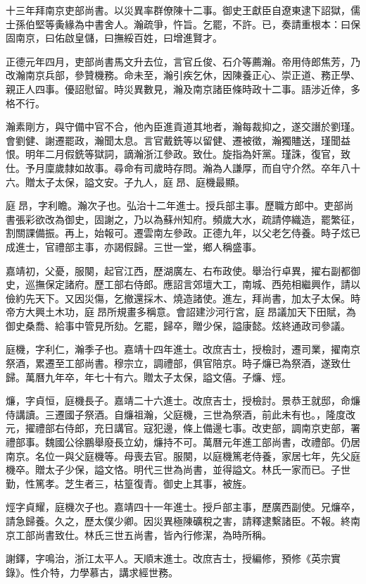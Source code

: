 \begin{pinyinscope}
十三年拜南京吏部尚書。以災異率群僚陳十二事。御史王獻臣自遼東逮下詔獄，儒士孫伯堅等夤緣為中書舍人。瀚疏爭，忤旨。乞罷，不許。已，奏請重根本：曰保固南京，曰佑啟皇儲，曰撫綏百姓，曰增進賢才。

正德元年四月，吏部尚書馬文升去位，言官丘俊、石介等薦瀚。帝用侍郎焦芳，乃改瀚南京兵部，參贊機務。命未至，瀚引疾乞休，因陳養正心、崇正道、務正學、親正人四事。優詔慰留。時災異數見，瀚及南京諸臣條時政十二事。語涉近倖，多格不行。

瀚素剛方，與守備中官不合，他內臣進貢道其地者，瀚每裁抑之，遂交譖於劉瑾。會劉健、謝遷罷政，瀚聞太息。言官戴銑等以留健、遷被徵，瀚獨贐送，瑾聞益恨。明年二月假銑等獄詞，謫瀚浙江參政。致仕。旋指為奸黨。瑾誅，復官，致仕。予月廩歲隸如故事。尋命有司歲時存問。瀚為人謙厚，而自守介然。卒年八十六。贈太子太保，謚文安。子九人，庭昂、庭機最顯。

庭昂，字利瞻。瀚次子也。弘治十二年進士。授兵部主事。歷職方郎中。吏部尚書張彩欲改為御史，固謝之，乃以為蘇州知府。頻歲大水，疏請停織造，罷繁征，割關課備振。再上，始報可。遷雲南左參政。正德九年，以父老乞侍養。時子炫已成進士，官禮部主事，亦謁假歸。三世一堂，鄉人稱盛事。

嘉靖初，父憂，服闋，起官江西，歷湖廣左、右布政使。舉治行卓異，擢右副都御史，巡撫保定諸府。歷工部右侍郎。應詔言郊壇大工，南城、西苑相繼興作，請以儉約先天下。又因災傷，乞撤還採木、燒造諸使。進左，拜尚書，加太子太保。時帝方大興土木功，庭昂所規畫多稱意。會詔建沙河行宮，庭昂議加天下田賦，為御史桑喬、給事中管見所劾。乞罷，歸卒，贈少保，謚康懿。炫終通政司參議。

庭機，字利仁，瀚季子也。嘉靖十四年進士。改庶吉士，授檢討，遷司業，擢南京祭酒，累遷至工部尚書。穆宗立，調禮部，俱官陪京。時子燫已為祭酒，遂致仕歸。萬曆九年卒，年七十有六。贈太子太保，謚文僖。子燫、烴。

燫，字貞恒，庭機長子。嘉靖二十六進士。改庶吉士，授檢討。景恭王就邸，命燫侍講讀。三遷國子祭酒。自燫祖瀚，父庭機，三世為祭酒，前此未有也。，隆度改元，擢禮部右侍郎，充日講官。寇犯邊，條上備邊七事。改吏部，調南京吏部，署禮部事。魏國公徐鵬舉廢長立幼，燫持不可。萬曆元年進工部尚書，改禮部。仍居南京。名位一與父庭機等。母喪去官。服闋，以庭機篤老侍養，家居七年，先父庭機卒。贈太子少保，謚文恪。明代三世為尚書，並得謚文。林氏一家而已。子世勤，性篤孝。芝生者三，枯篁復青。御史上其事，被旌。

烴字貞耀，庭機次子也。嘉靖四十一年進士。授戶部主事，歷廣西副使。兄燫卒，請急歸養。久之，歷太僕少卿。因災異極陳礦稅之害，請釋逮繫諸臣。不報。終南京工部尚書致仕。林氏三世五尚書，皆內行修潔，為時所稱。

謝鐸，字鳴治，浙江太平人。天順末進士。改庶吉士，授編修，預修《英宗實錄》。性介特，力學慕古，講求經世務。


\end{pinyinscope}
